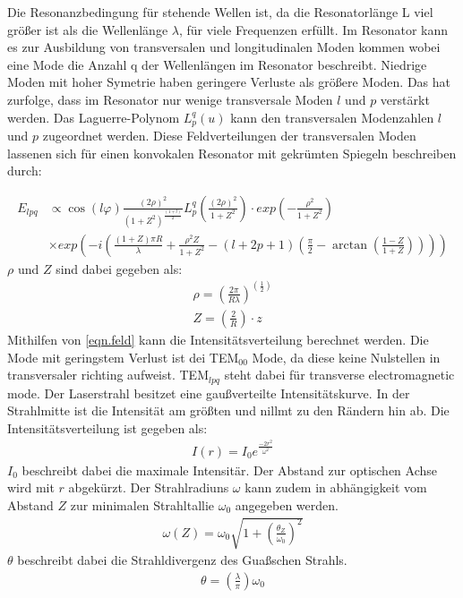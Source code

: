 Die Resonanzbedingung für stehende Wellen ist, da die Resonatorlänge L viel größer ist als die Wellenlänge $\lambda$, für viele Frequenzen erfüllt.
Im Resonator kann es zur Ausbildung von transversalen und longitudinalen Moden kommen wobei eine Mode die Anzahl q der Wellenlängen im Resonator beschreibt.
Niedrige Moden mit hoher Symetrie haben geringere Verluste als größere Moden.
Das hat zurfolge, dass im Resonator nur wenige transversale Moden $l$ und $p$ verstärkt werden.
Das Laguerre-Polynom $L_p^q(u)$ kann den transversalen Modenzahlen $l$ und $p$ zugeordnet werden.
Diese Feldverteilungen der transversalen Moden lassenen sich für einen konvokalen Resonator mit gekrümten Spiegeln beschreiben durch:

\begin{align}
  E_{lpq} &\propto \cos(l \varphi)\frac{(2\rho)^2}{(1+Z^2)^{\frac{(1+l)}{2}}}
  L_p^q\left(\frac{(2\rho)^2}{1+Z^2}\right)\cdot exp \left(-\frac{\rho^2}{1+Z^2}\right)\\
  &\times exp \left(-i\left(\frac{(1+Z)\pi R}{\lambda}+\frac{\rho^2Z}{1+Z^2}-(l+2p+1)\left(\frac{\pi}{2}-
  \arctan\left(\frac{1-Z}{1+Z}\right)\right)\right)\right)
\label{eqn.feld}
\end{align}
$\rho$ und $Z$ sind dabei gegeben als:
\begin{align*}
  \rho=\left(\frac{2\pi}{R\lambda}\right)^{(\frac{1}{2})}\\
  Z=\left(\frac{2}{R}\right)\cdot z
\end{align*}
Mithilfen von \ref{eqn.feld} kann die Intensitätsverteilung berechnet werden.
Die Mode mit geringstem Verlust ist dei TEM$_{00}$ Mode, da diese keine Nulstellen in transversaler richting aufweist.
TEM$_{lpq}$ steht dabei für transverse electromagnetic mode.
Der Laserstrahl besitzet eine gaußverteilte Intensitätskurve.
In der Strahlmitte ist die Intensität am größten und nillmt zu den Rändern hin ab.
Die Intensitätsverteilung ist gegeben als:
\begin{align*}
  I(r)=I_0e^{\frac{-2r^2}{\omega ^2}}
\end{align*}
$I_0$ beschreibt dabei die maximale Intensitär.
Der Abstand zur optischen Achse  wird mit $r$ abgekürzt.
Der Strahlradiuns $\omega$ kann zudem in abhängigkeit vom Abstand $Z$ zur minimalen Strahltallie $\omega_0$ angegeben werden.
\begin{align*}
  \omega(Z)=\omega_0\sqrt{1+\left(\frac{\theta_Z}{\omega_0}\right)^2}
\end{align*}
$\theta$ beschreibt dabei die Strahldivergenz des Guaßschen Strahls.
\begin{align*}
  \theta=\left(\frac{\lambda}{\pi}\right)\omega_0
\end{align*}
